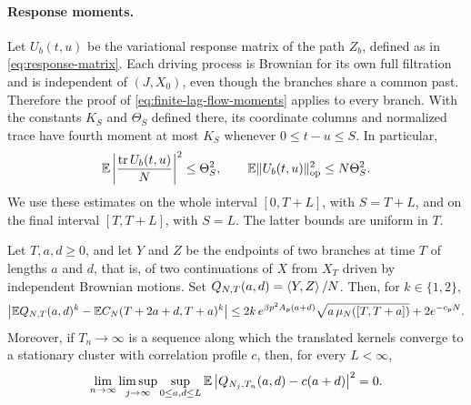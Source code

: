 \paragraph{Response moments.}
Let $U_b(t,u)$ be the variational response matrix of the path $Z_b$, defined as in \eqref{eq:response-matrix}. Each driving process is Brownian for its own full filtration and is independent of $(J,X_0)$, even though the branches share a common past. Therefore the proof of \eqref{eq:finite-lag-flow-moments} applies to every branch. With the constants $K_S$ and $\Theta_S$ defined there, its coordinate columns and normalized trace have fourth moment at most $K_S$ whenever $0\le t-u\le S$. In particular,
\[
 \mathbb E\left|\frac{\operatorname{tr} U_b(t,u)}N\right|^2\le\Theta_S^2,
 \qquad \mathbb E\lVert U_b(t,u)\rVert_{\mathrm{op}}^2\le N\Theta_S^2.
\]
We use these estimates on the whole interval $[0,T+L]$, with $S=T+L$, and on the final interval $[T,T+L]$, with $S=L$. The latter bounds are uniform in $T$.

\begin{lemma}\label{sel:fork-moments}
Let $T,a,d\ge0$, and let $Y$ and $Z$ be the endpoints of two branches at
time $T$ of lengths $a$ and $d$, that is, of two continuations of $X$ from
$X_T$ driven by independent Brownian motions. Set
$Q_{N,T}(a,d)=\left\langle Y,Z\right\rangle/N$. Then, for $k\in\{1,2\}$,
\begin{equation}\label{sel:fork-moment-comparison}
 \left|\mathbb E Q_{N,T}(a,d)^k-\mathbb E C_N(T+2a+d,T+a)^k\right|
 \le2k\,e^{\beta p^2A_p(a+d)}\sqrt{a\,\mu_N([T,T+a])}+2e^{-c_pN}.
\end{equation}
Moreover, if $T_n\to\infty$ is a sequence along which the translated kernels
converge to a stationary cluster with correlation profile $c$, then, for
every $L<\infty$,
\begin{equation}\label{sel:fork-overlap-concentration}
 \lim_{n\to\infty}\limsup_{j\to\infty}\sup_{0\le a,d\le L}
 \mathbb E\left|Q_{N_j,T_n}(a,d)-c(a+d)\right|^2=0.
\end{equation}
\end{lemma}


